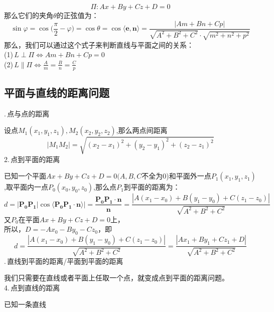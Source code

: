 \begin{equation}
	\nonumber
	\Pi:Ax+By+Cz+D=0
\end{equation}
那么它们的夹角$\theta$的正弦值为：
\begin{equation}
	\sin \varphi =\cos\bigg( \frac{\pi}{2}-\varphi\bigg)=\cos \theta=\cos \langle \boldsymbol{e},\boldsymbol{n}\rangle =\frac{|Am+Bn+Cp|}{\sqrt{A^2+B^2+C^2}\cdot\sqrt{m^2+n^2+p^2}}
\end{equation}
那么，我们可以通过这个式子来判断直线与平面之间的关系：\\
(1)$\, L\perp \Pi \Leftrightarrow  Am+Bn+Cp=0$\\
(2)$\, L\parallel \Pi \Leftrightarrow \displaystyle \frac{A}{m}=\frac{B}{n}=\frac{C}{p} $
\subsection{平面与直线的距离问题}
.$\,$点与点的距离
\par 设点$M_1(x_1,y_1,z_1),M_2(x_2,y_2,z_2)$,那么两点间距离
\begin{equation}
	|M_1M_2|=\sqrt{(x_2-x_1)^2+(y_2-y_1)^2+(z_2-z_1)^2}
\end{equation}
2.$\,$点到平面的距离
\par 已知一个平面$Ax+By+Cz+D=0(A,B,C$不全为0)和平面外一点$P_1(x_1,y_1,z_1)$,取平面内一点$P_0(x_0,y_0,z_0)$,那么点$P_1$到平面的距离为：
\begin{equation}
	d=|\boldsymbol{P_0P_1}|\cos \langle \boldsymbol{P_0P_1}\cdot \boldsymbol{n} \rangle|=\frac{\boldsymbol{P_0P_1}\cdot \boldsymbol{n}}{\boldsymbol{n}}=\frac{|A(x_1-x_0)+B(y_1-y_0)+C(z_1-z_0)|}{\sqrt{A^2+B^2+C^2}}
\end{equation}
又$P_0$在平面$Ax+By+Cz+D=0$上，\\
所以，$D=-Ax_0-By_0-Cz_0$，即
\begin{equation}
	d=\frac{|A(x_1-x_0)+B(y_1-y_0)+C(z_1-z_0)|}{\sqrt{A^2+B^2+C^2}}=\frac{|Ax_1+By_1+Cz_1+D|}{\sqrt{A^2+B^2+C^2}}
\end{equation}
\vspace*{-2.5em}
\summarize[联想二维空间中点到直线的距离公式进行记忆：
\begin{equation}
	d=\frac{|Ax_1+By_1+C|}{\sqrt{A^2+B^2}}
	\end{equation}]
.$\,$直线到平面的距离/平面到平面的距离
\par 我们只需要在直线或者平面上任取一个点，就变成点到平面的距离问题。\\
4.$\,$点到直线的距离
\par 已知一条直线
